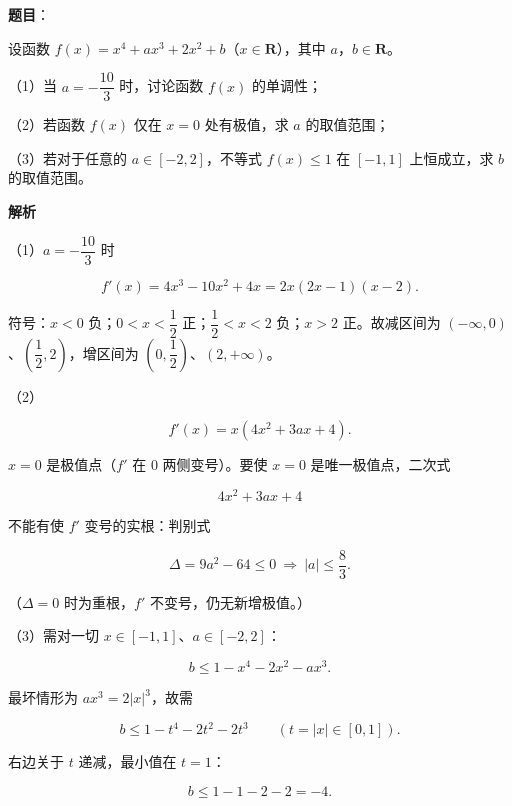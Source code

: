 \begin{answer}

\textbf{题目}：

设函数 $f(x)=x^4+ax^3+2x^2+b$（$x\in\mathbf R$），其中 $a$，$b\in\mathbf R$。

（1）当 $a=-\dfrac{10}3$ 时，讨论函数 $f(x)$ 的单调性；

（2）若函数 $f(x)$ 仅在 $x=0$ 处有极值，求 $a$ 的取值范围；

（3）若对于任意的 $a\in[-2,2]$，不等式 $f(x)\leqslant1$ 在 $[-1,1]$ 上恒成立，求 $b$ 的取值范围。

\textbf{解析}

（1）$a=-\dfrac{10}3$ 时

\nopagebreak[4]
\[f'(x)=4x^3-10x^2+4x=2x(2x-1)(x-2).\]

符号：$x<0$ 负；$0<x<\dfrac12$ 正；$\dfrac12<x<2$ 负；$x>2$ 正。故减区间为 $(-\infty,0)$、$\left(\dfrac12,2\right)$，增区间为 $\left(0,\dfrac12\right)$、$(2,+\infty)$。

（2）

\nopagebreak[4]
\[f'(x)=x\left(4x^2+3ax+4\right).\]

$x=0$ 是极值点（$f'$ 在 $0$ 两侧变号）。要使 $x=0$ 是唯一极值点，二次式

\nopagebreak[4]
\[4x^2+3ax+4\]

不能有使 $f'$ 变号的实根：判别式

\nopagebreak[4]
\[\Delta=9a^2-64\leqslant0\ \Longrightarrow\ |a|\leqslant\frac83.\]

（$\Delta=0$ 时为重根，$f'$ 不变号，仍无新增极值。）

（3）需对一切 $x\in[-1,1]$、$a\in[-2,2]$：

\nopagebreak[4]
\[b\leqslant1-x^4-2x^2-ax^3.\]

最坏情形为 $a x^3=2|x|^3$，故需

\nopagebreak[4]
\[b\leqslant1-t^4-2t^2-2t^3\qquad(t=|x|\in[0,1]).\]

右边关于 $t$ 递减，最小值在 $t=1$：

\nopagebreak[4]
\[b\leqslant1-1-2-2=-4.\]


\end{answer}
